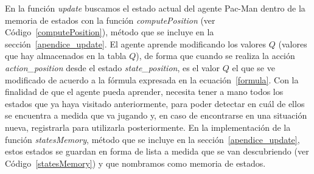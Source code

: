 \documentclass[11pt]{exam}
\begin{document}
En la función \textit{update} buscamos el estado actual del agente Pac-Man dentro de la memoria de estados con la función \textit{computePosition} (ver Código~\ref{computePosition}), método que se incluye en la sección~\ref{apendice_update}. El agente aprende modificando los valores $Q$ (valores que hay almacenados en la tabla $Q$), de forma que cuando se realiza la acción \textit{action\_position} desde el estado \textit{state\_position}, es el valor $Q$ el que se ve modificado de acuerdo a la fórmula expresada en la ecuación~\ref{formula}. Con la finalidad de que el agente pueda aprender, necesita tener a mano todos los estados que ya haya visitado anteriormente, para poder detectar en cuál de ellos se encuentra a medida que va jugando y, en caso de encontrarse en una situación nueva, registrarla para utilizarla posteriormente. En la implementación de la función \textit{statesMemory}, método que se incluye en la sección~\ref{apendice_update}, estos estados se guardan en forma de lista a medida que se van descubriendo (ver Código~\ref{statesMemory}) y que nombramos como memoria de estados.
\end{document}
